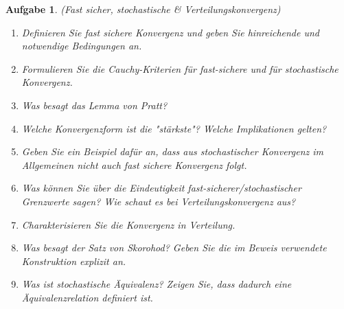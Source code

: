 \documentclass[11pt, a4paper, ngerman]{article}
\newtheorem{aufgabe}{Aufgabe}
\begin{document}
\begin{aufgabe} (Fast sicher, stochastische \& Verteilungskonvergenz)
    \begin{enumerate}
        \item 
        Definieren Sie fast sichere Konvergenz und geben Sie hinreichende und notwendige Bedingungen an. 
        \item 
        Formulieren Sie die Cauchy-Kriterien für fast-sichere und für stochastische Konvergenz. 
        \item
        Was besagt das Lemma von Pratt? 
        \item 
        Welche Konvergenzform ist die "stärkste"? Welche Implikationen gelten?  
        \item 
        Geben Sie ein Beispiel dafür an, dass aus stochastischer Konvergenz im Allgemeinen nicht auch fast sichere Konvergenz folgt. 
        \item 
        Was können Sie über die Eindeutigkeit fast-sicherer/stochastischer Grenzwerte sagen? Wie schaut es bei Verteilungskonvergenz aus?
        \item
        Charakterisieren Sie die Konvergenz in Verteilung. 
        \item 
        Was besagt der Satz von Skorohod? Geben Sie die im Beweis verwendete Konstruktion explizit an. 
        \item 
        Was ist stochastische Äquivalenz? Zeigen Sie, dass dadurch eine Äquivalenzrelation definiert ist. 
    \end{enumerate}
\end{aufgabe}
\end{document}
